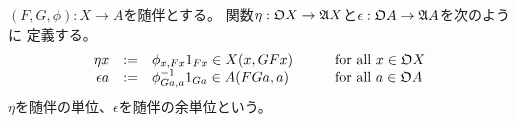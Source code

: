 {	\begin{definition}[随伴の単位と余単位]\label{def:随伴の単位と余単位} %
		$(F,G,\phi):X\to A$を随伴とする。
		関数$\eta:{\mathfrak{O}} X\to{\mathfrak{A}} X$と$\epsilon:{\mathfrak{O}} A\to{\mathfrak{A}} A$を次のように
		定義する。
		\begin{equation*}\begin{array}{rclcl}
			\eta x &:=& \phi_{x,Fx}1_{Fx} \in X(x,GFx)
			&\quad&\text{for all } x\in{\mathfrak{O}} X \\
			\epsilon a &:=& \phi_{Ga,a}^{-1}1_{Ga} \in A(FGa,a)
			&\quad&\text{for all } a\in{\mathfrak{O}} A \\
		\end{array}\end{equation*}
		$\eta$を随伴の単位、$\epsilon$を随伴の余単位という。\EOP
	\end{definition} %

}
